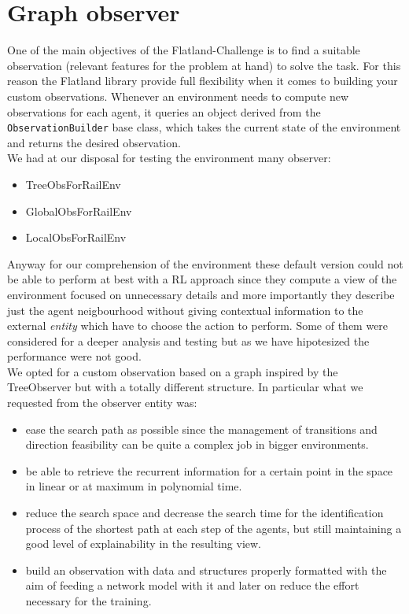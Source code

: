 \section{Graph observer}
One of the main objectives of the Flatland-Challenge is to find a suitable observation (relevant features for the problem at hand) to solve the task. For this reason the Flatland library provide full flexibility when it comes to building your custom observations. Whenever an environment needs to compute new observations for each agent, it queries an object derived from the \texttt{ObservationBuilder} base class, which takes the current state of the environment and returns the desired observation.\\
We had at our disposal for testing the environment many observer:
\begin{itemize}
\item TreeObsForRailEnv
\item GlobalObsForRailEnv
\item LocalObsForRailEnv
\end{itemize}
Anyway for our comprehension of the environment these default version could not be able to perform at best with a RL approach since they compute a view of the environment focused on unnecessary details and more importantly they describe just the agent neigbourhood without giving contextual information to the external \textit{entity} which have to choose the action to perform. Some of them were considered for a deeper analysis and testing but as we have hipotesized the performance were not good.\\
We opted for a custom observation based on a graph inspired by the TreeObserver but with a totally different structure. In particular what we requested from the observer entity was:
\begin{itemize}
    \item ease the search path as possible since the management of transitions and direction feasibility can be quite a complex job in bigger environments.
    \item be able to retrieve the recurrent information for a certain point in the space in linear or at maximum in polynomial time.
    \item reduce the search space and decrease the search time for the identification process of the shortest path at each step of the agents, but still maintaining a good level of explainability in the resulting view.
    \item build an observation with data and structures properly formatted with the aim of feeding a network model with it and later on reduce the effort necessary for the training.
\end{itemize}

